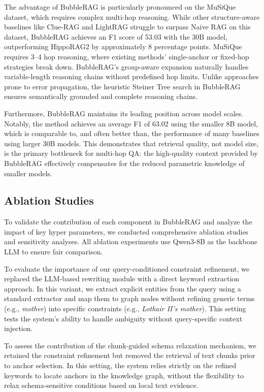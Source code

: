 The advantage of BubbleRAG is particularly pronounced on the MuSiQue dataset, which requires complex multi-hop reasoning. While other structure-aware baselines like Clue-RAG and LightRAG struggle to surpass Naive RAG on this dataset, BubbleRAG achieves an F1 score of 53.03 with the 30B model, outperforming HippoRAG2 by approximately 8 percentage points. MuSiQue requires 3--4 hop reasoning, where existing methods' single-anchor or fixed-hop strategies break down. BubbleRAG's group-aware expansion naturally handles variable-length reasoning chains without predefined hop limits. Unlike approaches prone to error propagation, the heuristic Steiner Tree search in BubbleRAG ensures semantically grounded and complete reasoning chains.

Furthermore, BubbleRAG maintains its leading position across model scales. Notably, the method achieves an average F1 of 63.02 using the smaller 8B model, which is comparable to, and often better than, the performance of many baselines using larger 30B models. This demonstrates that retrieval quality, not model size, is the primary bottleneck for multi-hop QA: the high-quality context provided by BubbleRAG effectively compensates for the reduced parametric knowledge of smaller models.

\subsection{Ablation Studies}

To validate the contribution of each component in BubbleRAG and analyze the impact of key hyper parameters, we conducted comprehensive ablation studies and sensitivity analyses. All ablation experiments use Qwen3-8B\cite{2025-qwen3} as the backbone LLM to ensure fair comparison.

 To evaluate the importance of our query-conditioned constraint refinement, we replaced the LLM-based rewriting module with a direct keyword extraction approach. In this variant, we extract explicit entities from the query using a standard extractor and map them to graph nodes without refining generic terms (e.g., \textit{mother}) into specific constraints (e.g., \textit{Lothair II's mother}). This setting tests the system's ability to handle ambiguity without query-specific context injection.

 To assess the contribution of the chunk-guided schema relaxation mechanism, we retained the constraint refinement but removed the retrieval of text chunks prior to anchor selection. In this setting, the system relies strictly on the refined keywords to locate anchors in the knowledge graph, without the flexibility to relax schema-sensitive conditions based on local text evidence.

